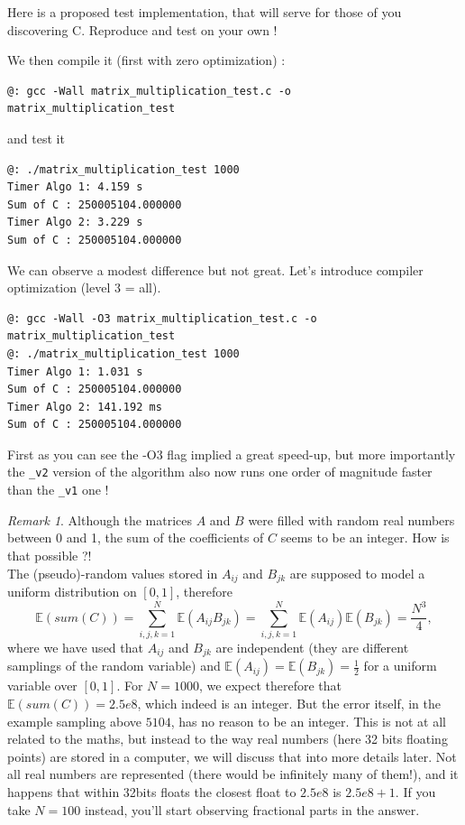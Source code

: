 \documentclass[12pt]{article}
\theoremstyle{plain}
\theoremstyle{remark}
\newtheorem{remark}{Remark}
\newcommand{\boE}{\mathbb{E}}
\begin{document}
\medskip

Here is a proposed test implementation, that will serve for those of you
discovering C. Reproduce and test on your own !



We then compile it (first with zero optimization) :

\begin{lstlisting}[style=bash]
@: gcc -Wall matrix_multiplication_test.c -o matrix_multiplication_test
\end{lstlisting}

and test it

\begin{lstlisting}[style=bash]
@: ./matrix_multiplication_test 1000
Timer Algo 1: 4.159 s
Sum of C : 250005104.000000
Timer Algo 2: 3.229 s
Sum of C : 250005104.000000
\end{lstlisting}

We can observe a modest difference but not great. Let's introduce compiler
optimization (level 3 = all).

\begin{lstlisting}[style=bash]
@: gcc -Wall -O3 matrix_multiplication_test.c -o matrix_multiplication_test
@: ./matrix_multiplication_test 1000
Timer Algo 1: 1.031 s
Sum of C : 250005104.000000
Timer Algo 2: 141.192 ms
Sum of C : 250005104.000000
\end{lstlisting}

First as you can see the -O3 flag implied a great speed-up, but more importantly 
the {\tt\_v2} version of the algorithm also now runs one order of magnitude faster than 
the {\tt\_v1} one !

\medskip

\begin{remark} Although the matrices $A$ and $B$ 
were filled with random real numbers between 0 and 1, the sum of 
the coefficients of $C$ seems to be an integer. How is that possible ?!\\ 
The (pseudo)-random values stored in $A_{ij}$ and $B_{jk}$  are supposed
to model a uniform distribution on $[0,1]$, therefore
$$
\boE(sum(C)) = \sum_{i,j,k = 1}^N \boE(A_{ij}B_{jk}) =  \sum_{i,j,k = 1}^N
\boE(A_{ij}) \boE(B_{jk}) = \frac{N^3}{4},
$$
where we have used that $A_{ij}$ and $B_{jk}$ are independent (they are
different samplings of the random variable) and $\boE(A_{ij}) = \boE(B_{jk}) =
\frac{1}{2}$ for a uniform variable over $[0,1]$. For $N = 1000$, we expect therefore
that $\boE(sum(C)) = 2.5e8$, which indeed is an integer. But the error itself,
in the example sampling above $5104$, has no reason to be an integer. This is
not at all related to the maths, but instead to the way real numbers (here 32
bits floating points) are stored in a computer, we will discuss that into more
details later. 
Not all real numbers are represented (there would be infinitely
many of them!), and it happens that within 32bits floats the closest float to
$2.5e8$ is $2.5e8 + 1.$ If you take $N = 100$ instead, you'll start
observing fractional parts in the answer.
\end{remark}
\end{document}

